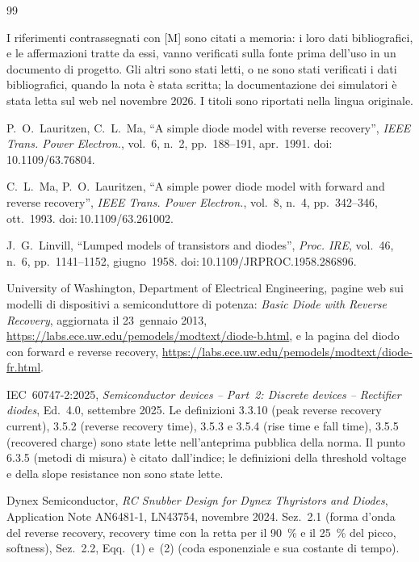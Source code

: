 \documentclass[10pt,a4paper]{scrartcl}
\begin{document}
\begin{thebibliography}{99}
\small
\item[] I riferimenti contrassegnati con [M] sono citati a memoria: i loro dati bibliografici, e le affermazioni tratte da essi, vanno verificati sulla fonte prima dell'uso in un documento di progetto. Gli altri sono stati letti, o ne sono stati verificati i dati bibliografici, quando la nota è stata scritta; la documentazione dei simulatori è stata letta sul web nel novembre 2026. I titoli sono riportati nella lingua originale.

P.~O.~Lauritzen, C.~L.~Ma, ``A simple diode model with reverse recovery'', \emph{IEEE Trans. Power Electron.}, vol.~6, n.~2, pp.~188--191, apr.~1991. doi:\,10.1109/63.76804.

C.~L.~Ma, P.~O.~Lauritzen, ``A simple power diode model with forward and reverse recovery'', \emph{IEEE Trans. Power Electron.}, vol.~8, n.~4, pp.~342--346, ott.~1993. doi:\,10.1109/63.261002.

J.~G.~Linvill, ``Lumped models of transistors and diodes'', \emph{Proc. IRE}, vol.~46, n.~6, pp.~1141--1152, giugno~1958. doi:\,10.1109/JRPROC.1958.286896.

University of Washington, Department of Electrical Engineering, pagine web sui modelli di dispositivi a semiconduttore di potenza: \emph{Basic Diode with Reverse Recovery}, aggiornata il 23~gennaio 2013, \url{https://labs.ece.uw.edu/pemodels/modtext/diode-b.html}, e la pagina del diodo con forward e reverse recovery, \url{https://labs.ece.uw.edu/pemodels/modtext/diode-fr.html}.

IEC~60747-2:2025, \emph{Semiconductor devices -- Part~2: Discrete devices -- Rectifier diodes}, Ed.~4.0, settembre 2025. Le definizioni 3.3.10 (peak reverse recovery current), 3.5.2 (reverse recovery time), 3.5.3 e 3.5.4 (rise time e fall time), 3.5.5 (recovered charge) sono state lette nell'anteprima pubblica della norma. Il punto 6.3.5 (metodi di misura) è citato dall'indice; le definizioni della threshold voltage e della slope resistance non sono state lette.

Dynex Semiconductor, \emph{RC Snubber Design for Dynex Thyristors and Diodes}, Application Note AN6481-1, LN43754, novembre 2024. Sez.~2.1 (forma d'onda del reverse recovery, recovery time con la retta per il \SI{90}{\percent} e il \SI{25}{\percent} del picco, softness), Sez.~2.2, Eqq.~(1) e~(2) (coda esponenziale e sua costante di tempo).


\end{thebibliography}
\end{document}
